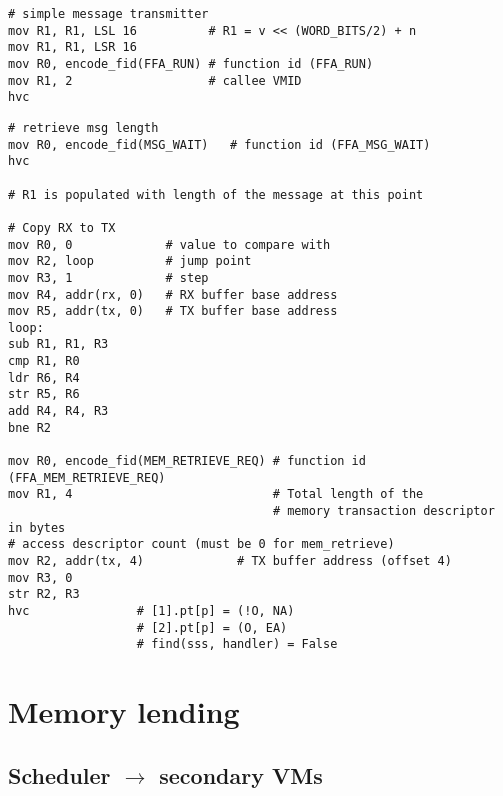 \documentclass{article}
\begin{document}
\begin{lstlisting}[caption={VM 0}]
# simple message transmitter
mov R1, R1, LSL 16          # R1 = v << (WORD_BITS/2) + n
mov R1, R1, LSR 16
mov R0, encode_fid(FFA_RUN) # function id (FFA_RUN)
mov R1, 2                   # callee VMID
hvc
\end{lstlisting}

\begin{lstlisting}[caption={VM 2}]
# retrieve msg length
mov R0, encode_fid(MSG_WAIT)   # function id (FFA_MSG_WAIT)
hvc

# R1 is populated with length of the message at this point

# Copy RX to TX
mov R0, 0             # value to compare with
mov R2, loop          # jump point
mov R3, 1             # step
mov R4, addr(rx, 0)   # RX buffer base address
mov R5, addr(tx, 0)   # TX buffer base address
loop:
sub R1, R1, R3
cmp R1, R0
ldr R6, R4
str R5, R6
add R4, R4, R3
bne R2

mov R0, encode_fid(MEM_RETRIEVE_REQ) # function id (FFA_MEM_RETRIEVE_REQ)
mov R1, 4                            # Total length of the  
                                     # memory transaction descriptor in bytes
# access descriptor count (must be 0 for mem_retrieve)
mov R2, addr(tx, 4)             # TX buffer address (offset 4)
mov R3, 0
str R2, R3                                    
hvc               # [1].pt[p] = (!O, NA)
                  # [2].pt[p] = (O, EA)
                  # find(sss, handler) = False
\end{lstlisting}

\section{Memory lending}

\subsection{Scheduler $\rightarrow$ secondary VMs}
\end{document}
